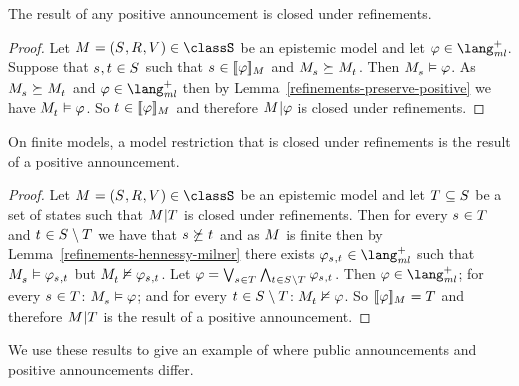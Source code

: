 \begin{lemma}\label{positive-announcements-refinement-closed}
The result of any positive announcement is closed under refinements.
\end{lemma}

\begin{proof}
Let $\kModelAndTuple \in \classS$ be an epistemic model and
let $\phi \in \langMlPlus$.
Suppose that $\kStateS, \kStateT \in \kStates$ such that $\kStateS \in \interpretation[\kModel]{\phi}$ and $\kPModel{\kStateS} \simulates \kPModel{\kStateT}$.
Then $\kPModel{\kStateS} \entails \phi$.
As $\kPModel{\kStateS} \simulates \kPModel{\kStateT}$ and $\phi \in \langMlPlus$ then by Lemma~\ref{refinements-preserve-positive} we have $\kPModel{\kStateT} \entails \phi$.
So $\kStateT \in \interpretation[\kModel]{\phi}$ and therefore $\restrict{\kModel}{\phi}$ is closed under refinements.
\end{proof}

\begin{lemma}\label{refinement-closed-positive-announcements}
On finite models, a model restriction that is closed under refinements is the result of a positive announcement.
\end{lemma}

\begin{proof}
Let $\kModelAndTuple \in \classS$ be an epistemic model and
let $\kStatesT \subseteq \kStates$ be a set of states such that $\restrict{\kModel}{\kStatesT}$ is closed under refinements.
Then for every $\kStateS \in \kStatesT$ and $\kStateT \in \kStates \setminus \kStatesT$ we have that $\kStateS \not\simulates \kStateT$ and as $\kModel$ is finite then by Lemma~\ref{refinements-hennessy-milner} there exists $\phi_{\kStateS,\kStateT} \in \langMlPlus$ such that $\kPModel{\kStateS} \entails \phi_{\kStateS,\kStateT}$ but $\kPModel{\kStateT} \nentails \phi_{\kStateS,\kStateT}$.
Let $\phi = \bigvee_{\kStateS \in \kStatesT} \bigwedge_{\kStateT \in \kStates \setminus \kStatesT} \phi_{\kStateS, \kStateT}$.
Then $\phi \in \langMlPlus$; 
for every $\kStateS \in \kStatesT$: $\kPModel{\kStateS} \entails \phi$; 
and for every $\kStateT \in \kStates \setminus \kStatesT$: $\kPModel{\kStateT} \nentails \phi$.
So $\interpretation[\kModel]{\phi} = \kStatesT$ and therefore $\restrict{\kModel}{\kStatesT}$ is the result of a positive announcement.
\end{proof}

We use these results to give an example of where public announcements and positive announcements differ.

